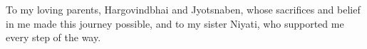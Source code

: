 \begin{center}
\vspace*{52pt}
To my loving parents, Hargovindbhai and Jyotsnaben, whose sacrifices and belief in me made this journey possible, and to my sister Niyati, who supported me every step of the way.
\end{center}
\pagebreak
